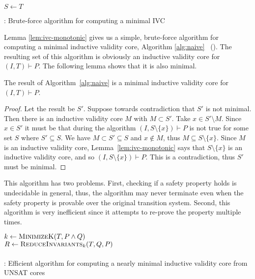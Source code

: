

\begin{algorithm}[t]
  \BlankLine
  $S \leftarrow T$ \\
   {
  }
\caption{\bfalg: Brute-force algorithm for computing a minimal IVC}
\label{alg:naive}
\end{algorithm}

Lemma \ref{lem:ivc-monotonic} gives us a simple, brute-force algorithm for computing
a minimal inductive validity core, Algorithm \ref{alg:naive} ~(\bfalg). The
resulting set of this algorithm is obviously an inductive validity
core for $(I, T)\vdash P$. The following lemma shows that it is also
minimal.

\begin{lemma}
  The result of Algorithm~\ref{alg:naive} is a minimal inductive validity core
  for $(I, T)\vdash P$.
\end{lemma}
\begin{proof}
  Let the result be $S'$. Suppose towards contradiction that $S'$ is not
  minimal. Then there is an inductive validity core $M$ with $M
  \subset S'$. Take $x \in S'\setminus M$. Since $x \in S'$ it must be
  that during the algorithm $(I, S\setminus\{x\})\vdash P$ is not true
  for some set $S$ where $S' \subseteq S$. We have $M \subset S'
  \subseteq S$ and $x\not\in M$, thus $M \subseteq S\setminus \{x\}$.
  Since $M$ is an inductive validity core,
  Lemma~\ref{lem:ivc-monotonic} says that $S\setminus \{x\}$ is an
  inductive validity core, and so $(I, S\setminus\{x\})\vdash P$. This
  is a contradiction, thus $S'$ must be minimal.
\end{proof}

This algorithm has two problems. First, checking if a safety property
holds is undecidable in general, thus, the algorithm may never terminate
even when the safety property is provable over the original
transition system. Second, this algorithm is very inefficient since it
attempts to re-prove the property multiple times.

\begin{algorithm}[t]
  \BlankLine
  $k \leftarrow \textsc{MinimizeK}(T, P \land Q)$ \\
  $R \leftarrow \textsc{ReduceInvariants}_k(T, Q, P)$ \\
  \\
\caption{\ucalg: Efficient algorithm for computing a nearly minimal inductive validity core from UNSAT cores}
\label{alg:ivc}
\end{algorithm}

